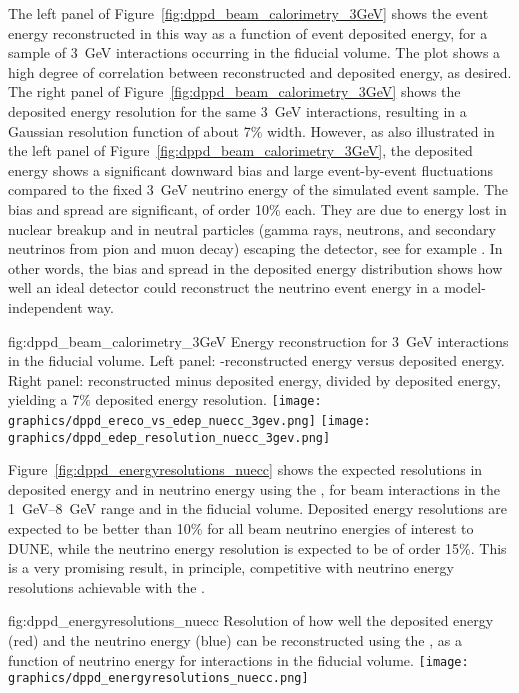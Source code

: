 The left panel of Figure~\ref{fig:dppd_beam_calorimetry_3GeV} shows the event energy reconstructed in this way  as a function of event deposited energy, for a sample of \SI{3}{\GeV} \nue {} interactions occurring in the  fiducial volume. The plot shows a high degree of correlation between reconstructed and deposited energy, as desired. The right panel of Figure~\ref{fig:dppd_beam_calorimetry_3GeV} shows the deposited energy resolution for the same \SI{3}{\GeV} interactions, resulting in a Gaussian resolution function of about \num{7}\% width. However, as also illustrated in the left panel of Figure~\ref{fig:dppd_beam_calorimetry_3GeV}, the deposited energy shows a significant downward bias and large event-by-event fluctuations compared to the fixed \SI{3}{GeV} neutrino energy of the simulated event sample. The bias and  spread are significant, of order \num{10}\% each. They are due to energy lost in nuclear breakup and in neutral particles (gamma rays, neutrons, and secondary neutrinos from pion and muon decay) escaping the detector, see for example \cite{Friedland:2018vry}. In other words, the bias and spread in the deposited energy distribution shows how well an ideal detector could reconstruct the neutrino event energy in a model-independent way.

\begin{dunefigure}{fig:dppd_beam_calorimetry_3GeV}
{Energy reconstruction for \SI{3}{GeV} \nue {} interactions in the \lar fiducial volume. Left panel: -reconstructed energy versus deposited energy. Right panel:  reconstructed minus deposited energy, divided by deposited energy, yielding a \num{7}\% deposited energy resolution.}
\texttt{[image: graphics/dppd\_ereco\_vs\_edep\_nuecc\_3gev.png]} \hfill
\texttt{[image: graphics/dppd\_edep\_resolution\_nuecc\_3gev.png]}
\end{dunefigure}

Figure~\ref{fig:dppd_energyresolutions_nuecc} shows the expected resolutions in deposited  energy and in neutrino  energy using the , for beam \nue {} interactions in the \SIrange{1}{8}{GeV} range and in the  fiducial volume. Deposited energy resolutions are expected to be better than \num{10}\% for all beam neutrino energies of interest to DUNE, while the neutrino energy resolution is expected to be of order \num{15}\%. This is a very promising result, in principle, competitive with neutrino energy resolutions achievable with the .

\begin{dunefigure}{fig:dppd_energyresolutions_nuecc}
{Resolution of how well the deposited energy (red) and the neutrino energy (blue) can be reconstructed using the , as a function of neutrino energy for \nue {} interactions in the \lar fiducial volume.}
\texttt{[image: graphics/dppd\_energyresolutions\_nuecc.png]}
\end{dunefigure}
